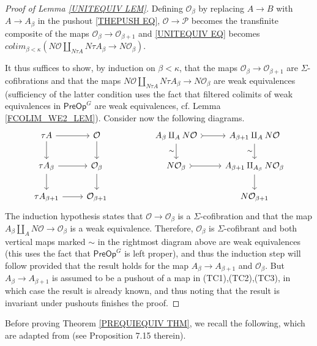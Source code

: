 \documentclass[a4paper,10pt
,draft
]{article}%
\numberwithin{equation}{section}
\numberwithin{figure}{section}
\theoremstyle{definition} %
\newcommand{\1}{\ensuremath{\mathbbm 1}}%
\begin{document}
\begin{proof}[Proof of Lemma \ref{UNITEQUIV LEM}]
	Defining $\mathcal{O}_{\beta}$ by replacing $A \to B$ with $A \to A_{\beta}$ in the pushout \eqref{THEPUSH EQ},
	$\mathcal{O} \to \mathcal{P}$ becomes the transfinite composite of the maps $\mathcal{O}_{\beta} \to \mathcal{O}_{\beta + 1}$
	and \eqref{UNITEQUIV EQ} becomes
	$
	colim_{\beta < \kappa} \left( 
	N \mathcal{O} \amalg_{N \tau A} N \tau A_{\beta}
	\to 
	N \mathcal{O}_{\beta}
	\right)
	$.

	It thus suffices to show, by induction on $\beta < \kappa$, 
	that the maps $\mathcal{O}_{\beta} \to \mathcal{O}_{\beta + 1}$ are $\Sigma$-cofibrations and that the maps 
	$N \mathcal{O} \amalg_{N \tau A} N \tau A_{\beta}
	\to 
	N \mathcal{O}_{\beta}$
	are weak equivalences
	(sufficiency of the latter condition uses the fact that 
	filtered colimits of weak equivalences in $\mathsf{PreOp}^G$ are weak equivalences, cf. Lemma \ref{FCOLIM_WE2_LEM}).
	Consider now the following diagrams.
	\[
	\begin{tikzcd}
	\tau A \ar{r} \ar{d} & \mathcal{O} \ar{d}
	&&
	A_{\beta} \amalg_{A} N \mathcal{O}
	\ar[>->]{r} \ar{d}[swap]{\sim} &
	A_{\beta+1} \amalg_{A} N \mathcal{O}
	\ar{d}[swap]{\sim}
	\\
	\tau A_{\beta} \ar{r} \ar{d} & \mathcal{O}_{\beta} \ar{d}
	&&
	N \mathcal{O}_{\beta} \ar[>->]{r} &
	A_{\beta+1} \amalg_{A_{\beta}} N \mathcal{O}_{\beta} \ar{d}
	\\
	\tau A_{\beta + 1} \ar{r} & \mathcal{O}_{\beta + 1}
	&&
	&
	N \mathcal{O}_{\beta+1}
	\end{tikzcd}
	\]
	The induction hypothesis states that
	$\mathcal{O} \to \mathcal{O}_{\beta}$ is a $\Sigma$-cofibration and that the map
	$A_{\beta} \amalg_A N \mathcal{O} \to \mathcal{O}_{\beta}$ is a weak equivalence.
	Therefore, $\mathcal{O}_{\beta}$ is $\Sigma$-cofibrant 
	and both vertical maps marked $\sim$ in the rightmost diagram above are weak equivalences 
	(this uses the fact that $\mathsf{PreOp}^G$ is left proper),
	and thus the induction step will follow provided that the result holds for
	the map $A_{\beta} \to A_{\beta + 1}$ and $\mathcal{O}_{\beta}$.
	But $A_{\beta} \to A_{\beta + 1}$ is assumed to be a pushout of a map in (TC1),(TC2),(TC3), 
	in which case the result is already known, and thus noting that the result is invariant under pushouts finishes the proof.
\end{proof}




Before proving Theorem \ref{PREQUIEQUIV THM}, 
we recall the following,
which are adapted from \cite{JT07} (see Proposition 7.15 therein). 
\end{document}
